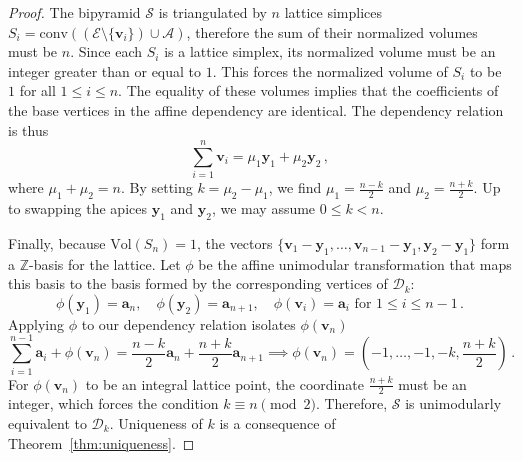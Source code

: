 \documentclass[a4paper,11pt,reqno]{amsart}
\newcommand{\Aa}{{\mathcal A}}
\newcommand{\Ss}{{\mathcal S}}
\newcommand{\Ee}{{\mathcal E}}
\begin{document}
\begin{proof}
The bipyramid $\Ss$ is triangulated by $n$ lattice simplices $S_i = \text{conv}((\Ee \setminus \{\bm{v}_i\}) \cup \Aa)$,
therefore the sum of their normalized volumes must be $n$. Since each $S_i$ is a lattice simplex, its normalized volume must 
be an integer greater than or equal to $1$. This forces the normalized volume of $S_i$ to be $1$ for all $1 \le i \le n$. The equality 
of these volumes implies that the coefficients of the base vertices in the affine dependency are identical. The dependency relation 
is thus
\[
\sum_{i=1}^n \bm{v}_i = \mu_1 \bm{y}_1 + \mu_2 \bm{y}_2 \,,
\]
where $\mu_1 + \mu_2 = n$. By setting $k = \mu_2 - \mu_1$, we find $\mu_1 = \frac{n-k}{2}$ and $\mu_2 = \frac{n+k}{2}$. 
Up to swapping the apices $\bm{y}_1$ and $\bm{y}_2$, we may assume $0 \le k < n$.
		
Finally, because $\text{Vol}(S_n) = 1$, the vectors $\{\bm{v}_1 - \bm{y}_1, \dots, \bm{v}_{n-1} - \bm{y}_1, \bm{y}_2 - \bm{y}_1\}$ 
form a $\mathbb{Z}$-basis for the lattice. Let $\phi$ be the affine unimodular transformation that maps this basis to the basis 
formed by the corresponding vertices of $\mathcal{D}_k$:
\[ 
\phi(\bm{y}_1) = \bm{a}_n, \quad \phi(\bm{y}_2) = \bm{a}_{n+1}, \quad \phi(\bm{v}_i) = \bm{a}_i \text{ for } 1 \le i \le n-1\,.
\]
Applying $\phi$ to our dependency relation isolates $\phi(\bm{v}_n)$
\[
\sum_{i=1}^{n-1} \bm{a}_i + \phi(\bm{v}_n) = \frac{n-k}{2} \bm{a}_n + \frac{n+k}{2} \bm{a}_{n+1} \implies 
\phi(\bm{v}_n) = \left(-1, \dots, -1, -k, \frac{n+k}{2}\right) \,.
\]
For $\phi(\bm{v}_n)$ to be an integral lattice point, the coordinate $\frac{n+k}{2}$ must be an integer, which forces the condition 
$k \equiv n \pmod 2$. Therefore, $\Ss$ is unimodularly equivalent to $\mathcal{D}_k$. Uniqueness of $k$ is a consequence
of Theorem~\ref{thm:uniqueness}.
\end{proof}
\end{document}
